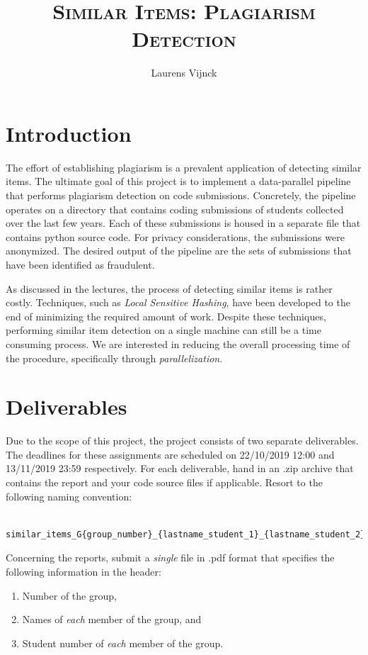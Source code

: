 \documentclass[11pt]{article}
\author{Laurens Vijnck}
\title{\textsc{Similar Items: Plagiarism Detection}}
\date{}
\theoremstyle{definition}
\begin{document}
	\maketitle
	
\section{Introduction}

The effort of establishing plagiarism is a prevalent application of detecting similar items. The ultimate goal of this project is to implement a data-parallel pipeline that performs plagiarism detection on code submissions. Concretely, the pipeline operates on a directory that contains coding submissions of students collected over the last few years. Each of these submissions is housed in a separate file that contains python source code. For privacy considerations, the submissions were anonymized. The desired output of the pipeline are the sets of submissions that have been identified as fraudulent.

As discussed in the lectures, the process of detecting similar items is rather costly. Techniques, such as \emph{Local Sensitive Hashing}, have been developed to the end of minimizing the required amount of work. Despite these techniques, performing similar item detection on a single machine can still be a time consuming process. We are interested in reducing the overall processing time of the procedure, specifically through \emph{parallelization}.

\section{Deliverables}

Due to the scope of this project, the project consists of two separate deliverables. The deadlines for these assignments are scheduled on 22/10/2019 12:00 and 13/11/2019 23:59 respectively. For each deliverable, hand in an .zip archive that contains the report and your code source files if applicable. Resort to the following naming convention:

\begin{verbatim}
	similar_items_G{group_number}_{lastname_student_1}_{lastname_student_2}.zip
\end{verbatim}

Concerning the reports, submit a \emph{single} file in .pdf format that specifies the following information in the header:

\begin{enumerate}[label=\textbf{\arabic*}.]
	\item Number of the group,
	\item Names of \emph{each} member of the group, and
	\item Student number of \emph{each} member of the group.
\end{enumerate}
\end{document}
